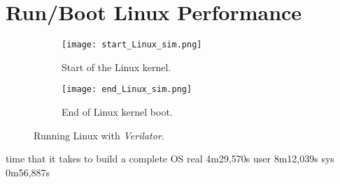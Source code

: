 \section{Run/Boot Linux Performance}
\begin{figure}
    \centering
    \begin{subfigure}[b]{0.49\textwidth}
        \centering
        \texttt{[image: start\_Linux\_sim.png]}
        \caption{Start of the Linux kernel.}
        \label{fig:start_linux_verilator}
    \end{subfigure}
    \hfill
    \begin{subfigure}[b]{0.49\textwidth}
        \centering
        \texttt{[image: end\_Linux\_sim.png]}
        \caption{End of Linux kernel boot.}
        \label{fig:end_linux_verilator}
    \end{subfigure}
    \caption{Running Linux with \textit{Verilator}.}
    \label{fig:linux_verilator}
\end{figure}
time that it takes to build a complete OS
real    4m29,570s
user    8m12,039s
sys    0m56,887s


